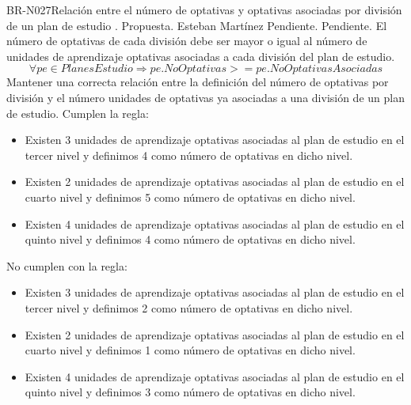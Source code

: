 \begin{BusinessRule}{BR-N027}{Relación entre el número de optativas y optativas asociadas por división de un plan de estudio}
	{\bcIntegridad}    %
	{\btEnabler}     %
	{\blControlling}    %
	.
	\BRItem[Estado] Propuesta.
	 Esteban Martínez
	 Pendiente.
	 Pendiente.
	\BRItem[Descripción] El número de optativas de cada división debe ser mayor o igual al número de unidades de aprendizaje optativas asociadas a cada división del plan de estudio.
	\BRItem[Sentencia]
	\[ \forall pe \in PlanesEstudio \Rightarrow pe.NoOptativas >= pe.NoOptativasAsociadas\]
	\BRItem[Motivación] Mantener una correcta relación entre la definición del número de optativas por división y el número unidades de optativas ya asociadas a una división de un plan de estudio.
	 Cumplen la regla:
	\begin{itemize}
		\item Existen 3 unidades de aprendizaje optativas asociadas al plan de estudio en el tercer nivel y definimos 4 como número de optativas en dicho nivel.
		\item Existen 2 unidades de aprendizaje optativas asociadas al plan de estudio en el cuarto nivel y definimos 5 como número de optativas en dicho nivel.
		\item Existen 4 unidades de aprendizaje optativas asociadas al plan de estudio en el quinto nivel y definimos 4 como número de optativas en dicho nivel.
	\end{itemize}
	 No cumplen con la regla:
	\begin{itemize}
		\item Existen 3 unidades de aprendizaje optativas asociadas al plan de estudio en el tercer nivel y definimos 2 como número de optativas en dicho nivel.
		\item Existen 2 unidades de aprendizaje optativas asociadas al plan de estudio en el cuarto nivel y definimos 1 como número de optativas en dicho nivel.
		\item Existen 4 unidades de aprendizaje optativas asociadas al plan de estudio en el quinto nivel y definimos 3 como número de optativas en dicho nivel.
	\end{itemize}
	
\end{BusinessRule}

